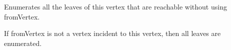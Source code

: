 \documentclass[letterpaper,12pt,english]{sphinxmanual}
\begin{document}
\begin{fulllineitems}
\begin{fulllineitems}
\label{\detokenize{api/modules:cbmpy.fluxmodules.decomposition.Vertex.getLeaves}}
\pysigstartsignatures
\pysiglinewithargsret
{}
{}
{}
\pysigstopsignatures
\sphinxAtStartPar
Enumerates all the leaves of this vertex that are reachable without using
fromVertex.

\sphinxAtStartPar
If fromVertex is not a vertex incident to this vertex, then all leaves are
enumerated.

\end{fulllineitems}


\begin{fulllineitems}
\label{\detokenize{api/modules:cbmpy.fluxmodules.decomposition.Vertex.isSimple}}
\pysigstartsignatures
\pysiglinewithargsret
{}
{}
{}
\pysigstopsignatures
\end{fulllineitems}


\end{fulllineitems}

\end{document}
